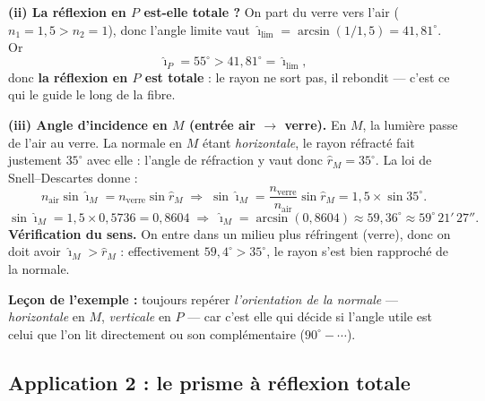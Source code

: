 \documentclass[11pt,a4paper]{article}
\newcommand{\angi}{\hat{\imath}}     %
\begin{document}
\begin{exemple}
\textbf{(ii) La réflexion en $P$ est-elle totale ?} On part du verre vers l'air ($n_1 = 1{,}5 > n_2 = 1$),
donc l'angle limite vaut $\angi_{\text{lim}} = \arcsin(1/1{,}5) = 41{,}81^\circ$. Or
\[ \angi_P = 55^\circ > 41{,}81^\circ = \angi_{\text{lim}}, \]
donc \textbf{la réflexion en $P$ est totale} : le rayon ne sort pas, il rebondit — c'est ce qui le
guide le long de la fibre.

\textbf{(iii) Angle d'incidence en $M$ (entrée air $\to$ verre).} En $M$, la lumière passe de l'air au
verre. La normale en $M$ étant \emph{horizontale}, le rayon réfracté fait justement $35^\circ$ avec
elle : l'angle de réfraction y vaut donc $\hat{r}_M = 35^\circ$. La loi de Snell–Descartes donne :
\[ n_{\text{air}}\sin\angi_M = n_{\text{verre}}\sin\hat{r}_M
   \;\Longrightarrow\; \sin\angi_M = \frac{n_{\text{verre}}}{n_{\text{air}}}\sin\hat{r}_M
   = 1{,}5 \times \sin 35^\circ. \]
\[ \sin\angi_M = 1{,}5 \times 0{,}5736 = 0{,}8604
   \;\Longrightarrow\; \angi_M = \arcsin(0{,}8604) \approx 59{,}36^\circ \approx 59^\circ\,21'\,27''. \]
\textbf{Vérification du sens.} On entre dans un milieu plus réfringent (verre), donc on doit avoir
$\angi_M > \hat{r}_M$ : effectivement $59{,}4^\circ > 35^\circ$, le rayon s'est bien rapproché de la
normale.

\textbf{Leçon de l'exemple :} toujours repérer \emph{l'orientation de la normale} — \emph{horizontale}
en $M$, \emph{verticale} en $P$ — car c'est elle qui décide si l'angle utile est celui que l'on lit
directement ou son complémentaire ($90^\circ - \cdots$).
\end{exemple}

\subsection{Application 2 : le prisme à réflexion totale}
\end{document}
